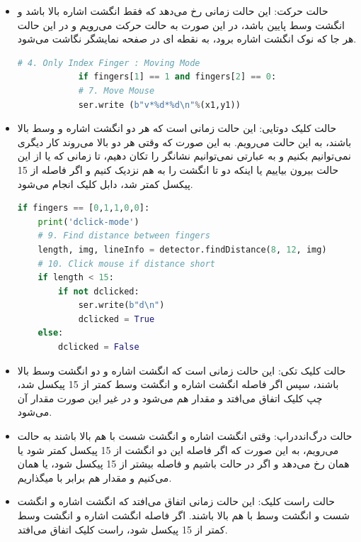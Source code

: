 \documentclass{article}
\begin{document}
\begin{itemize}
	\item حالت حرکت:
	این حالت زمانی رخ می‌دهد که فقط انگشت اشاره بالا باشد و انگشت وسط پایین باشد، در این صورت به حالت حرکت می‌رویم و در این حالت هر جا که نوک انگشت اشاره برود، به نقطه ای در صفحه 
	نمایشگر نگاشت می‌شود.
\begin{latin}
\begin{lstlisting}[language=python]
		# 4. Only Index Finger : Moving Mode
    		if fingers[1] == 1 and fingers[2] == 0:
        	# 7. Move Mouse
        	ser.write (b"v*%d*%d\n"%(x1,y1))
\end{lstlisting}
\end{latin}
	
	\item حالت کلیک دوتایی:
	این حالت زمانی است که هر دو انگشت اشاره و وسط بالا باشند، به این حالت می‌رویم. به این صورت که وقتی هر دو بالا می‌روند کار دیگری نمی‌توانیم بکنیم و به عبارتی نمی‌توانیم نشانگر را تکان دهیم، تا زمانی که یا از این حالت بیرون بیاییم یا اینکه دو تا انگشت را به هم نزدیک کنیم و اگر فاصله از 15 پیکسل کمتر شد، دابل کلیک انجام می‌شود.
	
\begin{latin}
\begin{lstlisting}[language=python]
if fingers == [0,1,1,0,0]:
    print('dclick-mode')
    # 9. Find distance between fingers
    length, img, lineInfo = detector.findDistance(8, 12, img)
    # 10. Click mouse if distance short
    if length < 15:
        if not dclicked:
            ser.write(b"d\n")
            dclicked = True
    else:
        dclicked = False
\end{lstlisting}	
\end{latin}
	\item حالت کلیک تکی:
	این حالت زمانی است که انگشت اشاره و دو انگشت وسط بالا باشند، سپس اگر فاصله انگشت اشاره و انگشت وسط کمتر از 15 پیکسل شد، چپ کلیک اتفاق می‌افتد و مقدار  هم  می‌شود و در غیر این صورت مقدار آن  می‌شود.	
	
	
	\item حالت درگ‌اند‌دراپ:
	وقتی انگشت اشاره و انگشت شست با هم بالا باشند به حالت  می‌رویم، به این صورت که اگر فاصله این دو انگشت از 15 پیکسل کمتر شود  یا همان  رخ می‌دهد و اگر در حالت  باشیم و فاصله بیشتر از 15 پیکسل شود،  یا همان  می‌کنیم و مقدار  هم برابر با  میگذاریم.
	
	\item حالت راست کلیک:
	این حالت زمانی اتفاق می‌افتد که انگشت اشاره و انگشت شست و انگشت وسط با هم بالا باشند. اگر فاصله انگشت اشاره و انگشت وسط کمتر از 15 پیکسل شود، راست کلیک اتفاق می‌افتد.
	

\end{itemize}
\end{document}

